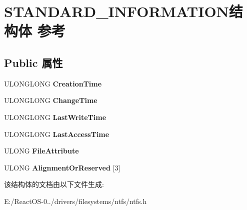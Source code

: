 \hypertarget{struct_s_t_a_n_d_a_r_d___i_n_f_o_r_m_a_t_i_o_n}{}\section{S\+T\+A\+N\+D\+A\+R\+D\+\_\+\+I\+N\+F\+O\+R\+M\+A\+T\+I\+O\+N结构体 参考}
\label{struct_s_t_a_n_d_a_r_d___i_n_f_o_r_m_a_t_i_o_n}
\subsection*{Public 属性}
\begin{DoxyCompactItemize}
\item 
\mbox{\label{struct_s_t_a_n_d_a_r_d___i_n_f_o_r_m_a_t_i_o_n_aa17f51243dc3917c813620e84c4b3795}} 
U\+L\+O\+N\+G\+L\+O\+NG {\bfseries Creation\+Time}
\item 
\mbox{\label{struct_s_t_a_n_d_a_r_d___i_n_f_o_r_m_a_t_i_o_n_a593acaf7b2e9b498c5e8d043f16f19e0}} 
U\+L\+O\+N\+G\+L\+O\+NG {\bfseries Change\+Time}
\item 
\mbox{\label{struct_s_t_a_n_d_a_r_d___i_n_f_o_r_m_a_t_i_o_n_a63dc38e6f70e37692c59a768e011ac95}} 
U\+L\+O\+N\+G\+L\+O\+NG {\bfseries Last\+Write\+Time}
\item 
\mbox{\label{struct_s_t_a_n_d_a_r_d___i_n_f_o_r_m_a_t_i_o_n_a345629d13866e9a6aa5588c4e36b5ee4}} 
U\+L\+O\+N\+G\+L\+O\+NG {\bfseries Last\+Access\+Time}
\item 
\mbox{\label{struct_s_t_a_n_d_a_r_d___i_n_f_o_r_m_a_t_i_o_n_a9e4dd9219b76c043e6cbb2654e71d717}} 
U\+L\+O\+NG {\bfseries File\+Attribute}
\item 
\mbox{\label{struct_s_t_a_n_d_a_r_d___i_n_f_o_r_m_a_t_i_o_n_a1cc150941b465be31fc230b2f2c359cd}} 
U\+L\+O\+NG {\bfseries Alignment\+Or\+Reserved} \mbox{[}3\mbox{]}
\end{DoxyCompactItemize}


该结构体的文档由以下文件生成\+:\begin{DoxyCompactItemize}
\item 
E\+:/\+React\+O\+S-\/0../drivers/filesystems/ntfs/ntfs.\+h\end{DoxyCompactItemize}
